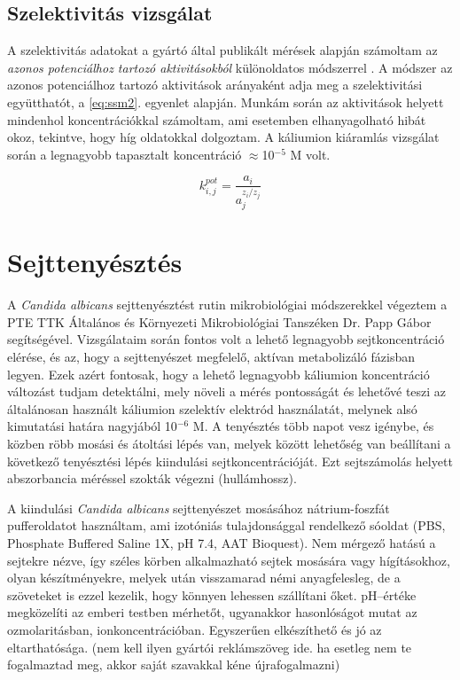 \subsection{Szelektivitás vizsgálat}

A szelektivitás adatokat a gyártó által publikált mérések alapján \cite{thermo} számoltam az \emph{azonos potenciálhoz tartozó aktivitásokból} különoldatos módszerrel \cite{buck1994recommendations}. A módszer az azonos potenciálhoz tartozó aktivitások arányaként adja meg a szelektivitási együtthatót, a \ref{eq:ssm2}. egyenlet alapján. Munkám során az aktivitások helyett mindenhol koncentrációkkal számoltam, ami esetemben elhanyagolható hibát okoz, tekintve, hogy híg oldatokkal dolgoztam. A káliumion kiáramlás vizsgálat során a legnagyobb tapasztalt koncentráció $\approx$10$^{-5}$ M volt.

\begin{equation}
k_{i,j}^{pot}=\frac{a_i}{a_j^{z_i/z_j}}
\label{eq:ssm2}
\end{equation}

\section{Sejttenyésztés}

A \emph{Candida albicans} sejttenyésztést rutin mikrobiológiai módszerekkel végeztem a PTE TTK Általános és Környezeti Mikrobiológiai Tanszéken Dr. Papp Gábor segítségével. Vizsgálataim során fontos volt a lehető legnagyobb sejtkoncentráció elérése, és az, hogy a sejttenyészet megfelelő, aktívan metabolizáló fázisban legyen. Ezek azért fontosak, hogy a lehető legnagyobb káliumion koncentráció változást tudjam detektálni, mely növeli a mérés pontosságát és lehetővé teszi az általánosan használt káliumion szelektív elektród használatát, melynek alsó kimutatási határa nagyjából 10$^{-6}$ M. A tenyésztés több napot vesz igénybe, és közben röbb mosási és átoltási lépés van, melyek között lehetőség van beállítani a következő tenyésztési lépés kiindulási sejtkoncentrációját. Ezt sejtszámolás helyett abszorbancia méréssel szokták végezni (hullámhossz).

A kiindulási \emph{Candida albicans} sejttenyészet mosásához nátrium-foszfát pufferoldatot használtam, ami izotóniás tulajdonsággal rendelkező sóoldat (PBS, Phosphate Buffered Saline 1X, pH 7.4, AAT Bioquest). Nem mérgező hatású a sejtekre nézve, így széles körben alkalmazható sejtek mosására vagy hígításokhoz, olyan készítményekre, melyek után visszamarad némi anyagfelesleg, de a szöveteket is ezzel kezelik, hogy könnyen lehessen szállítani őket. pH--értéke megközelíti az emberi testben mérhetőt, ugyanakkor hasonlóságot mutat az ozmolaritásban, ionkoncentrációban. Egyszerűen elkészíthető és jó az eltarthatósága. (nem kell ilyen gyártói reklámszöveg ide. ha esetleg nem te fogalmaztad meg, akkor saját szavakkal kéne újrafogalmazni)

